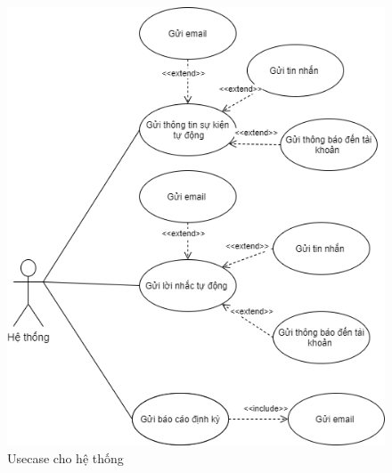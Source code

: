\documentclass[12pt,a4paper]{article}
\begin{document}
    \begin{figure}[H]
        \centering \includegraphics[width=\textwidth]{Img/Usecase/usecase_system.png}
        \vspace{0.5cm}
        \caption{Usecase cho hệ thống}
        \label{usecasesystem}
    \end{figure}
\end{document}
